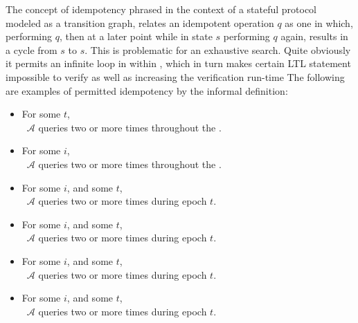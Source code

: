 The concept of idempotency phrased in the context of a stateful protocol modeled as a transition graph, relates an idempotent operation \(q\) as one in which, performing \(q\), then at a later point while in state \(s\) performing \(q\) again, results in a cycle from \(s\) to \(s\).
This is problematic for an exhaustive search.
Quite obviously it permits an infinite loop in within \CGKAmod, which in turn makes certain LTL statement impossible to verify as well as increasing the verification run-time
The following are examples of permitted idempotency by the informal \CGKAsec definition:

\begin{itemize}
  \item For some \(t\),\\~\hspace{4em}\(\mathcal{A}\) queries     two or more times throughout the \CGKAsec.  
  \item For some \(i\),\\~\hspace{4em}\(\mathcal{A}\) queries  two or more times throughout the \CGKAsec.
  \item For some \(i\), and some \(t\),\\~\hspace{4em}\(\mathcal{A}\) queries         two or more times during epoch \(t\).
  \item For some \(i\), and some \(t\),\\~\hspace{4em}\(\mathcal{A}\) queries     two or more times during epoch \(t\).
  \item For some \(i\), and some \(t\),\\~\hspace{4em}\(\mathcal{A}\) queries  two or more times during epoch \(t\).
  \item For some \(i\), and some \(t\),\\~\hspace{4em}\(\mathcal{A}\) queries  two or more times during epoch \(t\).

\end{itemize}

